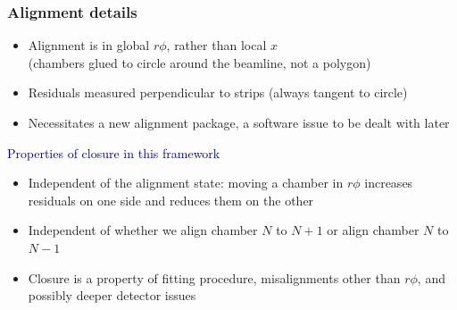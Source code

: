 \documentclass[compress]{beamer}
\begin{document}
\begin{frame}
\frametitle{Alignment details}
\small
\begin{itemize}
\item Alignment is in global $r\phi$, rather than local $x$ \\ (chambers glued to circle around the beamline, not a polygon)
\item Residuals measured perpendicular to strips (always tangent to circle)
\item Necessitates a new alignment package, a software issue to be dealt with later
\end{itemize}

\vspace{0.4 cm}
\hspace{-0.83 cm} \textcolor{darkblue}{\Large Properties of closure in this framework}

\vspace{0.2 cm}
\begin{itemize}
\item Independent of the alignment state: moving a chamber in $r\phi$
  increases residuals on one side and reduces them on the other
\item Independent of whether we align chamber $N$ to $N+1$ or align chamber $N$ to $N-1$
\item Closure is a property of fitting procedure, misalignments other
  than $r\phi$, and possibly deeper detector issues
\end{itemize}
\end{frame}
\end{document}
